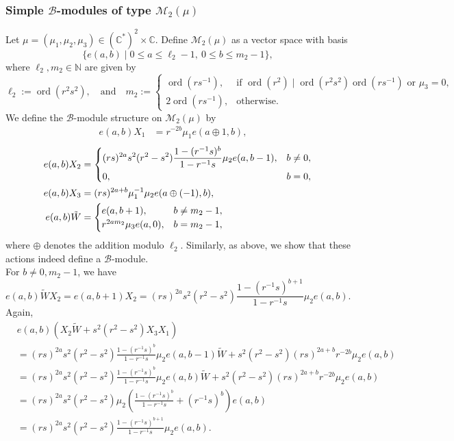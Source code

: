 \documentclass[12 pt,reqno]{amsart}
\numberwithin{equation}{section}
\DeclareMathOperator{\ord}{ord}
\theoremstyle{definition}
\theoremstyle{definition}
\theoremstyle{remark}
\theoremstyle{remark}
\begin{document}
\subsubsection{\texorpdfstring{\textbf{\upshape Simple $\mathcal{B}$-modules of type $\mathcal{M}_2(\mu)$}}{}}
 Let $ \mu = (\mu_1, \mu_2, \mu_3) \in (\mathbb{C}^*)^2 \times \mathbb{C} $. 
Define $ \mathcal{M}_2(\mu) $ as a vector space with basis  
$$
    \{ e(a, b) \mid 0 \leq a \leq \ell_2 - 1, \ 0 \leq b \leq m_2 - 1 \},
$$  
where $ \ell_2, m_2 \in \mathbb{N} $ are given by  
\begin{equation}\label{Eq5.6}
  \ell_2 := \ord(r^{2}s^2), \quad \text{and}\quad   m_2 := 
    \begin{cases}
        \ord(rs^{-1}), & \text{if } \ord(r^2) \mid \ord(r^{2}s^2) \ord(rs^{-1}) \text{ or } \mu_3=0 , \\[5pt]
        2\ord(rs^{-1}), & \text{otherwise}.
    \end{cases}
\end{equation}
We define the $ \mathcal{B} $-module structure on $ \mathcal{M}_2(\mu) $ by
\begin{align}\label{Eq5.7}
e(a,b)X_1 &= r^{-2b} \mu_1 e(a \oplus 1, b),\quad \end{align}
\begin{align}
 e(a,b)X_2&= 
    \begin{cases}\label{Eq5.8}
    \displaystyle(rs)^{2a}s^2 (r^2 - s^2)  
            \frac{1 - (r^{-1}s)^b}{1 - r^{-1}s} \mu_2 e(a,b-1), & b \neq 0, \\[5pt]
        0, & b = 0,
    \end{cases}\\ \label{Eq5.9}
e(a,b)X_3 &= (rs)^{2a+b} \mu_1^{-1} \mu_2 e(a \oplus (-1), b), \\ e(a,b)\tilde{W}&=\begin{cases}
    e(a,b+1), & b \neq m_2-1,\\
    r^{2am_2}\mu_3e(a,0), & b=m_2-1,
\end{cases}\notag
\end{align}
where $\oplus$ denotes the addition modulo $\ell_2$. Similarly, as above, we show that these actions indeed define a $\mathcal{B}$-module. \\
For $b \neq 0, m_2-1$, we have 
\[e(a,b)\tilde{W}X_2=e(a,b+1)X_2=(rs)^{2a}s^2(r^2-s^2)\displaystyle\frac{1 - (r^{-1}s)^{b+1}}{1 - r^{-1}s} \mu_2e(a,b). \]
Again, 
\begin{align*}
    &e(a,b)\left(X_2\tilde{W}+s^2(r^2-s^2)X_3X_1\right)\\
    &=(rs)^{2a}s^2 (r^2 - s^2)  
           \displaystyle \frac{1 - (r^{-1}s)^b}{1 - r^{-1}s} \mu_2 e(a,b-1)\tilde{W}+s^2(r^2-s^2)(rs)^{2a+b}r^{-2b}\mu_2 e(a,b)\\
     &=(rs)^{2a}s^2 (r^2 - s^2)  
           \displaystyle \frac{1 - (r^{-1}s)^b}{1 - r^{-1}s} \mu_2 e(a,b)\tilde{W}+s^2(r^2-s^2)(rs)^{2a+b}r^{-2b}\mu_2 e(a,b)\\
     &=(rs)^{2a}s^2(r^2-s^2)\mu_2\left(\displaystyle\frac{1 - (r^{-1}s)^b}{1 - r^{-1}s}+(r^{-1}s)^b\right)e(a,b)\\
     &=(rs)^{2a}s^2(r^2-s^2)\displaystyle\frac{1 - (r^{-1}s)^{b+1}}{1 - r^{-1}s} \mu_2e(a,b).
\end{align*}
\end{document}

